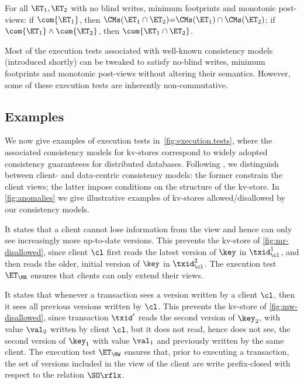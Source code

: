 \begin{theorem}[Compositionality]  
\label{thm:compositional}   
For all $\ET_1, \ET_2$ with no blind writes, minimum footprints and monotonic post-views: 
if $\com{\ET_1}$, 
then $\CMs(\ET_1 \cap \ET_2) {=} \CMs(\ET_1) \cap \CMs(\ET_2)$;
if $\com{\ET_1} \land \com{\ET_2}$, then $\com{\ET_1 \cap \ET_2}$.
\end{theorem}

Most of the execution tests associated with well-known consistency models (introduced shortly)
can be tweaked to satisfy no-blind writes, minimum footprints and monotonic post-views 
without altering their semantics. However, some of these execution tests
are inherently non-commutative.


\subsection{Examples}\label{subsec:cm_examples}

We now give examples of execution tests in~\cref{fig:execution.tests},
where the associated consistency models for kv-stores correspond to
widely adopted consistency guaranteees for distributed databases.
Following \cite{distrprinciples}, we distinguish between
client- and data-centric consistency models: 
the former constrain the client views; 
the latter impose conditions on the structure of the kv-store.  
In \cref{fig:anomalies} we give illustrative
examples of kv-stores allowed/disallowed by our
consistency models.


It states that a client cannot lose information from the view and 
hence can only see increasingly more up-to-date versions. 
This prevents \eg the kv-store of \cref{fig:mr-disallowed},
since client $\cl$ first reads the latest version of $\key$ in $\txid_{\cl}^{1}$, 
and then reads the older, initial version of $\key$ in $\txid_{\cl}^{2}$.  
The execution test $\ET_{\MR}$ ensures that clients  can only extend their views. 

It states that whenever a transaction sees a version written by a client $\cl$,
then it sees all previous versions written by $\cl$. 
This prevents \eg the kv-store of \cref{fig:mw-disallowed}, since 
transaction $\txid'$ reads the second version of $\key_2$, 
with value $\val_2$ written by client $\cl$, 
but it does not read, hence does not see, the second version of $\key_1$
with value $\val_1$ and previously written by the same client.
The execution test $\ET_{\MW}$  ensures that, prior to executing a transaction,
the set of versions included in the view of the client are write 
prefix-closed with respect to the relation $\SO\rflx$.

